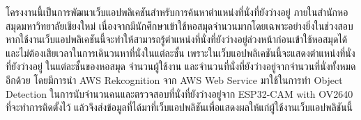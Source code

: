 \maketitle
\makesignature

\ifproject
\begin{abstractTH}
    โครงงานนี้เป็นการพัฒนาเว็บแอปพลิเคชันสำหรับการค้นหาตำแหน่งที่นั่งที่ยังว่างอยู่ 
    \enskip ภายในสำนักหอสมุดมหาวิทยาลัยเชียงใหม่ 
    เนื่องจากมีนักศึกษาเข้าใช้หอสมุดจำนวนมากโดยเฉพาะอย่างยิ่งในช่วงสอบ 
    หากใช้งานเว็บแอปพลิเคชันนี้จะทำให้สามารถรู้ตำแหน่งที่นั่งที่ยังว่างอยู่ล่วงหน้าก่อนเข้าใช้หอสมุดได้ 
    และไม่ต้องเสียเวลาในการเดินวนหาที่นั่งในแต่ละชั้น เพราะในเว็บแอปพลิเคชันนี้จะแสดงตำแหน่งที่นั่งที่ยังว่างอยู่
    \enskip ในแต่ละชั้นของหอสมุด จำนวนผู้ใช้งาน และจำนวนที่นั่งที่ยังว่างอยู่จากจำนวนที่นั่งทั้งหมดอีกด้วย 
    โดยมีการนำ AWS Rekcognition จาก AWS Web Service มาใช้ในการทำ Object Detection 
    ในการนับจำนวนคนและตรวจสอบที่นั่งที่ยังว่างอยู่จาก ESP32-CAM with OV2640 ที่จะทำการติดตั้งไว้ 
    แล้วจึงส่งข้อมูลที่ได้มาที่เว็บแอปพลิชันเพื่อแสดงผลให้แก่ผู้ใช้งานเว็บแอปพลิชันนี้    
\end{abstractTH}

\iffalse
\begin{dedication}
This document is dedicated to all Chiang Mai University students.

Dedication page is optional.
\end{dedication}
\fi %

\contentspage

\ifproject
\figurelistpage
\fi %



